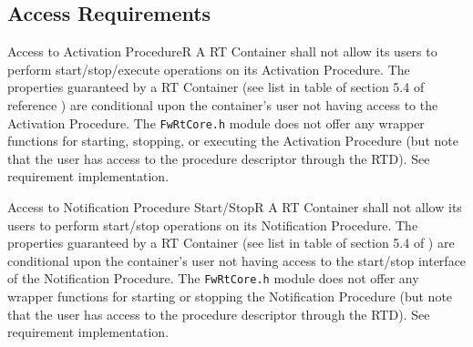 \documentclass[requirements]{../fwprofile}
\begin{document}
\subsection{Access Requirements}\label{req:access}

\begin{fw_req}{Access to Activation Procedure}{R}
{A RT Container shall not allow its users to perform start/stop/execute operations on its Activation Procedure.}
{The properties guaranteed by a RT Container (see list in table of section 5.4 of reference \cite{ref:fwprofile}) are conditional upon the container's user not having access to the Activation Procedure. }
{The \texttt{FwRtCore.h} module does not offer any wrapper functions for starting, stopping, or executing the Activation Procedure (but note that the user has access to the procedure descriptor through the RTD).} 
{See requirement implementation.}
\end{fw_req}

\begin{fw_req}{Access to Notification Procedure Start/Stop}{R}
{A RT Container shall not allow its users to perform start/stop operations on its Notification Procedure.}
{The properties guaranteed by a RT Container (see list in table of section 5.4 of \cite{ref:fwprofile}) are conditional upon the container's user not having access to the start/stop interface of the Notification Procedure. }
{The \texttt{FwRtCore.h} module does not offer any wrapper functions for starting or stopping the Notification Procedure (but note that the user has access to the procedure descriptor through the RTD).} 
{See requirement implementation.}
\end{fw_req}
\end{document}
